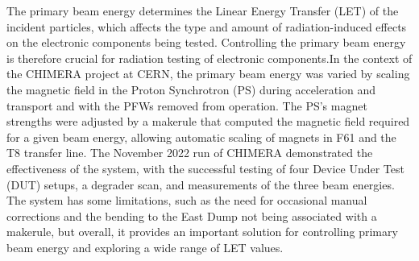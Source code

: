 \documentclass{cernatsnote}
\begin{document}
 The primary beam energy determines the Linear Energy Transfer (LET) of the incident particles, which affects the type and amount of radiation-induced effects on the electronic components being tested. Controlling the primary beam energy is therefore crucial for radiation testing of electronic components.In the context of the CHIMERA project at CERN, the primary beam energy was varied by scaling the magnetic field in the Proton Synchrotron (PS) during acceleration and transport and with the PFWs removed from operation. The PS's magnet strengths were adjusted by a makerule that computed the magnetic field required for a given beam energy, allowing automatic scaling of magnets in F61 and the T8 transfer line. The November 2022 run of CHIMERA demonstrated the effectiveness of the system, with the successful testing of four Device Under Test (DUT) setups, a degrader scan, and measurements of the three beam energies. The system has some limitations, such as the need for occasional manual corrections and the bending to the East Dump not being associated with a makerule, but overall, it provides an important solution for controlling primary beam energy and exploring a wide range of LET values.



\end{document}
